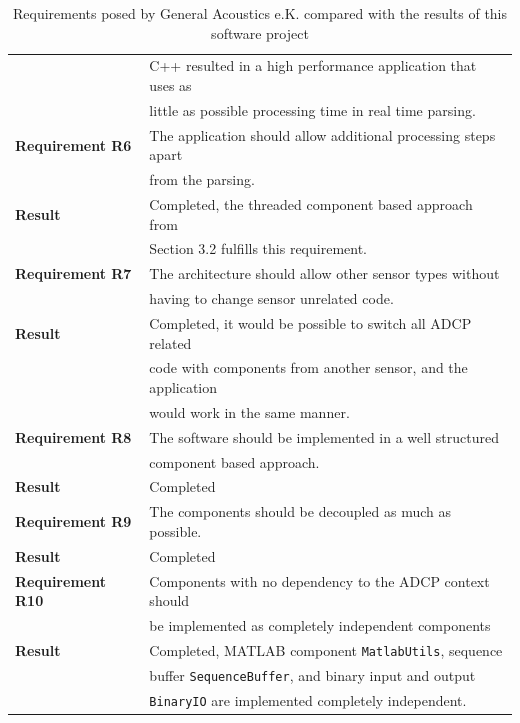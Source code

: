 \begin{table}[!ht]
\begin{tabular}{|l|l|}
	  	& C++ resulted in a high performance application that uses as\\
	  	& little as possible processing time in real time parsing. \\
	  \hline
	  \hline
	  	\textbf{Requirement R6} 
	  	& The application should allow additional processing steps apart\\
	  	& from the parsing.\\ \hline
	  	\textbf{Result} 
	  	& Completed, the threaded component based approach from\\
	  	& Section 3.2 fulfills this requirement.\\
	  \hline
	  \hline
	  	\textbf{Requirement R7} 
	  	& The architecture should allow other sensor types without\\
	  	& having to change sensor unrelated code.\\ \hline
	  	\textbf{Result} 
	  	& Completed, it would be possible to switch all ADCP related\\
	  	& code with components from another sensor, and the application\\
	  	& would work in the same manner.\\
	  \hline
	  \hline
	  	\textbf{Requirement R8} 
	  	& The software should be implemented in a well structured\\
	  	& component based approach.\\ \hline
	  	\textbf{Result} & Completed \\
	  \hline
	  \hline
	  	\textbf{Requirement R9} & The components should be decoupled as much as possible.\\ \hline
	  	\textbf{Result} & Completed \\
	  \hline
	  \hline
	  	\textbf{Requirement R10} 
	  	& Components with no dependency to the ADCP context should\\
	  	& be implemented as completely independent components\\ \hline
	  	\textbf{Result} 
	  	& Completed, MATLAB component \texttt{MatlabUtils}, sequence\\
	  	& buffer \texttt{SequenceBuffer}, and binary input and output\\
	  	& \texttt{BinaryIO} are implemented completely independent.\\
	  \hline
	\end{tabular}
	\caption{Requirements posed by General Acoustics e.K. compared with the results of this software project}
\end{table}

